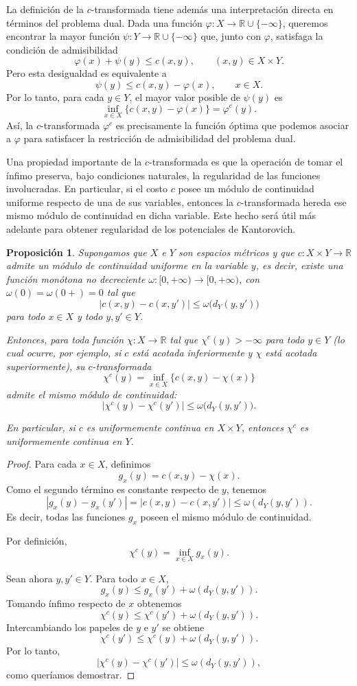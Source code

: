 \documentclass[12pt, a4paper]{amsbook}
\newcommand{\R}{{\mathbb R}}
\newtheorem{prop}[teo]{Proposición}
\theoremstyle{remark}
\theoremstyle{definition}
\numberwithin{section}{chapter}
\numberwithin{subsection}{section}
\numberwithin{equation}{section}
\numberwithin{figure}{chapter}
\begin{document}
La definición de la $c$-transformada tiene además una interpretación directa
en términos del problema dual. Dada una función
$\varphi\colon X\to\R\cup\{-\infty\}$, queremos encontrar la mayor función
$\psi\colon Y\to\R\cup\{-\infty\}$ que, junto con $\varphi$, satisfaga la
condición de admisibilidad
\[
\varphi(x)+\psi(y)\leq c(x,y),
\qquad (x,y)\in X\times Y.
\]
Pero esta desigualdad es equivalente a
\[
\psi(y)\leq c(x,y)-\varphi(x),
\qquad x\in X.
\]
Por lo tanto, para cada $y\in Y$, el mayor valor posible de $\psi(y)$ es
\[
\inf_{x\in X}\{c(x,y)-\varphi(x)\}
=\varphi^c(y).
\]
Así, la $c$-transformada $\varphi^c$ es precisamente la función óptima que
podemos asociar a $\varphi$ para satisfacer la restricción de admisibilidad
del problema dual.

Una propiedad importante de la $c$-transformada es que la operación de tomar
el ínfimo preserva, bajo condiciones naturales, la regularidad de las
funciones involucradas. En particular, si el costo $c$ posee un módulo de
continuidad uniforme respecto de una de sus variables, entonces la
$c$-transformada hereda ese mismo módulo de continuidad en dicha variable.
Este hecho será útil más adelante para obtener regularidad de los potenciales
de Kantorovich.

\begin{prop}\label{prop.ctransf.modulo}
Supongamos que $X$ e $Y$ son espacios métricos y que
\(
c\colon X\times Y\longrightarrow\R
\)
admite un módulo de continuidad uniforme en la variable $y$, es decir,
existe una función monótona no decreciente
\(
\omega\colon[0,+\infty)\to[0,+\infty)
\),
con \(\omega(0)=\omega(0+)=0\)
tal que
\[
|c(x,y)-c(x,y')|
\leq
\omega\bigl(d_Y(y,y')\bigr)
\]
para todo $x\in X$ y todo $y,y'\in Y$.

Entonces, para toda función
\(
\chi\colon X\longrightarrow\R
\)
tal que $\chi^c(y)>-\infty$ para todo $y\in Y$ (lo cual ocurre, por ejemplo,
si $c$ está acotada inferiormente y $\chi$ está acotada superiormente),
su $c$-transformada
\[
\chi^c(y)
=
\inf_{x\in X}\{c(x,y)-\chi(x)\}
\]
admite el mismo módulo de continuidad:
\[
|\chi^c(y)-\chi^c(y')|
\leq
\omega\bigl(d_Y(y,y')\bigr).
\]

En particular, si $c$ es uniformemente continua en $X\times Y$, entonces
$\chi^c$ es uniformemente continua en $Y$.
\end{prop}

\begin{proof}
Para cada $x\in X$, definimos
\[
g_x(y)=c(x,y)-\chi(x).
\]
Como el segundo término es constante respecto de $y$, tenemos
\[
|g_x(y)-g_x(y')|
=
|c(x,y)-c(x,y')|
\leq
\omega(d_Y(y,y')).
\]
Es decir, todas las funciones $g_x$ poseen el mismo módulo de
continuidad.

Por definición,
\[
\chi^c(y)=\inf_{x\in X}g_x(y).
\]

Sean ahora $y,y'\in Y$. Para todo $x\in X$,
\[
g_x(y)
\leq
g_x(y')+\omega(d_Y(y,y')).
\]
Tomando ínfimo respecto de $x$ obtenemos
\[
\chi^c(y)
\leq
\chi^c(y')+\omega(d_Y(y,y')).
\]
Intercambiando los papeles de $y$ e $y'$ se obtiene
\[
\chi^c(y')
\leq
\chi^c(y)+\omega(d_Y(y,y')).
\]
Por lo tanto,
\[
|\chi^c(y)-\chi^c(y')|
\leq
\omega(d_Y(y,y')),
\]
como queríamos demostrar.
\end{proof}
\end{document}
